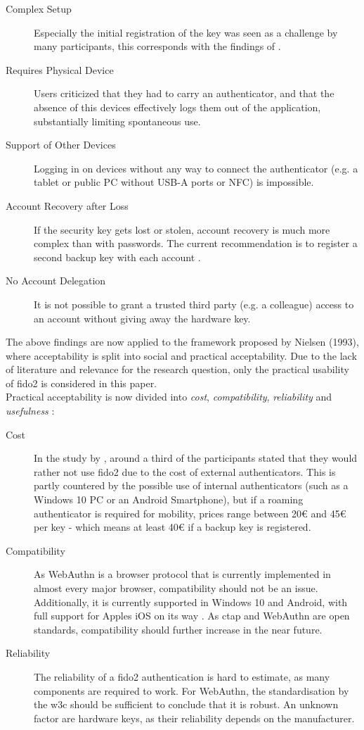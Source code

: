 \begin{description}
    \item[Complex Setup] Especially the initial registration of the key was seen as a challenge by many participants, this corresponds with the findings of \cite{das2018}.
    \item[Requires Physical Device] Users criticized that they had to carry an authenticator, and that the absence of this devices effectively logs them out of the application, substantially limiting spontaneous use.
    \item[Support of Other Devices] Logging in on devices without any way to connect the authenticator (e.g. a tablet or public PC without USB-A ports or NFC) is impossible.
    \item[Account Recovery after Loss] If the security key gets lost or stolen, account recovery is much more complex than with passwords. The current recommendation is to register a second backup key with each account \cite{gomi2019}.
    \item[No Account Delegation] It is not possible to grant a trusted third party (e.g. a colleague) access to an account without giving away the hardware key.
\end{description}

\noindent The above findings are now applied to the framework proposed by Nielsen (1993), where acceptability is split into social and practical acceptability. Due to the lack of literature and relevance for the research question, only the practical usability of \ac{fido2} is considered in this paper.\\
Practical acceptability is now divided into \emph{cost}, \emph{compatibility}, \emph{reliability} and \emph{usefulness} \cite[25 \psq]{nielsen1993}:

\begin{description}
    \item[Cost] In the study by \cite{lyastani2020}, around a third of the participants stated that they would rather not use \ac{fido2} due to the cost of external authenticators. This is partly countered by the possible use of internal authenticators (such as a Windows 10 PC or an Android Smartphone), but if a roaming authenticator is required for mobility, prices range between 20€ and 45€ per key \cite{yubikey_5_nfc} - which means at least 40€ if a backup key is registered.
    \item[Compatibility] As WebAuthn is a browser protocol that is currently implemented in almost every major browser, compatibility should not be an issue. Additionally, it is currently supported in Windows 10 and Android, with full support for Apples iOS on its way \cite{nichols2020}. As \ac{ctap} and WebAuthn are open standards, compatibility should further increase in the near future.
    \item[Reliability] The reliability of a \ac{fido2} authentication is hard to estimate, as many components are required to work. For WebAuthn, the standardisation by the \ac{w3c} should be sufficient to conclude that it is robust. An unknown factor are hardware keys, as their reliability depends on the manufacturer.
\end{description}

